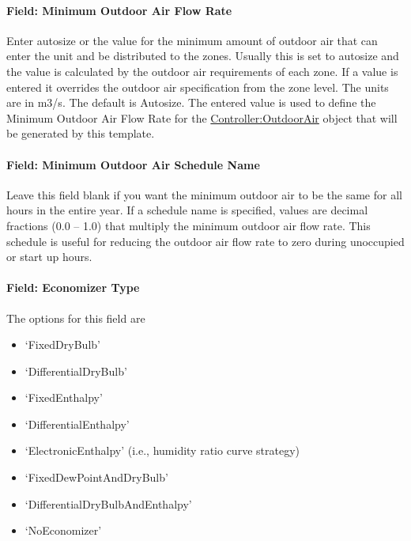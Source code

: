 \paragraph{Field: Minimum Outdoor Air Flow Rate}\label{field-minimum-outdoor-air-flow-rate-5}

Enter autosize or the value for the minimum amount of outdoor air that can enter the unit and be distributed to the zones. Usually this is set to autosize and the value is calculated by the outdoor air requirements of each zone. If a value is entered it overrides the outdoor air specification from the zone level. The units are in m3/s. The default is Autosize. The entered value is used to define the Minimum Outdoor Air Flow Rate for the \hyperref[controlleroutdoorair]{Controller:OutdoorAir} object that will be generated by this template.

\paragraph{Field: Minimum Outdoor Air Schedule Name}\label{field-minimum-outdoor-air-schedule-name-4}

Leave this field blank if you want the minimum outdoor air to be the same for all hours in the entire year. If a schedule name is specified, values are decimal fractions (0.0 -- 1.0) that multiply the minimum outdoor air flow rate. This schedule is useful for reducing the outdoor air flow rate to zero during unoccupied or start up hours.

\paragraph{Field: Economizer Type}\label{field-economizer-type-5}

The options for this field are

\begin{itemize}
\item
  `FixedDryBulb'
\item
  `DifferentialDryBulb'
\item
  `FixedEnthalpy'
\item
  `DifferentialEnthalpy'
\item
  `ElectronicEnthalpy' (i.e., humidity ratio curve strategy)
\item
  `FixedDewPointAndDryBulb'
\item
  `DifferentialDryBulbAndEnthalpy'
\item
  `NoEconomizer'
\end{itemize}

